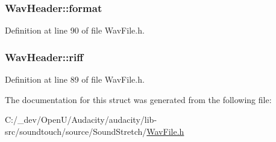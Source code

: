 \subsubsection[{\texorpdfstring{format}{format}}]{ Wav\+Header\+::format}\hypertarget{struct_wav_header_a5b193f1dcd7e3621b16ea569554bd118}{}\label{struct_wav_header_a5b193f1dcd7e3621b16ea569554bd118}


Definition at line 90 of file Wav\+File.\+h.

\subsubsection[{\texorpdfstring{riff}{riff}}]{ Wav\+Header\+::riff}\hypertarget{struct_wav_header_aacf1b3e3efff56e6edb9a29b666a65c4}{}\label{struct_wav_header_aacf1b3e3efff56e6edb9a29b666a65c4}


Definition at line 89 of file Wav\+File.\+h.



The documentation for this struct was generated from the following file\+:\begin{DoxyCompactItemize}
\item 
C\+:/\+\_\+dev/\+Open\+U/\+Audacity/audacity/lib-\/src/soundtouch/source/\+Sound\+Stretch/\hyperlink{_wav_file_8h}{Wav\+File.\+h}\end{DoxyCompactItemize}
